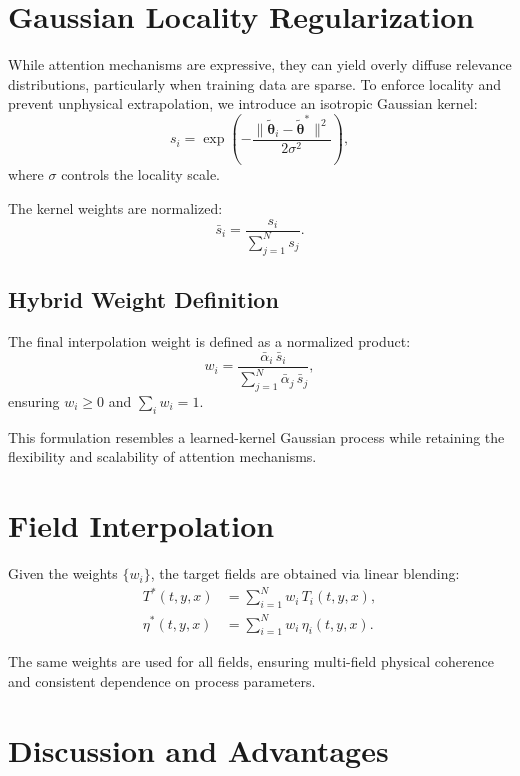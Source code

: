 \documentclass[10pt]{article}
\begin{document}
\section{Gaussian Locality Regularization}

While attention mechanisms are expressive, they can yield overly diffuse relevance distributions, particularly when training data are sparse. To enforce locality and prevent unphysical extrapolation, we introduce an isotropic Gaussian kernel:
\begin{equation}
s_i = \exp\left( -\frac{\lVert \tilde{\boldsymbol{\theta}}_i - \tilde{\boldsymbol{\theta}}^* \rVert^2}{2\sigma^2} \right),
\end{equation}
where $\sigma$ controls the locality scale.

The kernel weights are normalized:
\begin{equation}
\bar{s}_i = \frac{s_i}{\sum_{j=1}^{N} s_j}.
\end{equation}

\subsection{Hybrid Weight Definition}

The final interpolation weight is defined as a normalized product:
\begin{equation}
w_i = \frac{\bar{\alpha}_i \, \bar{s}_i}{\sum_{j=1}^{N} \bar{\alpha}_j \, \bar{s}_j},
\end{equation}
ensuring $w_i \ge 0$ and $\sum_i w_i = 1$.

This formulation resembles a learned-kernel Gaussian process while retaining the flexibility and scalability of attention mechanisms.

\section{Field Interpolation}

Given the weights $\{w_i\}$, the target fields are obtained via linear blending:
\begin{align}
T^*(t,y,x) &= \sum_{i=1}^{N} w_i \, T_i(t,y,x), \\
\eta^*(t,y,x) &= \sum_{i=1}^{N} w_i \, \eta_i(t,y,x).
\end{align}

The same weights are used for all fields, ensuring multi-field physical coherence and consistent dependence on process parameters.

\section{Discussion and Advantages}
\end{document}

